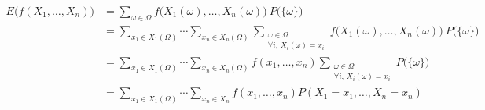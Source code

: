 \begin{prv}
	\begin{align*}
		E\big(f(X_1, \ldots, X_n)\big) &= \sum_{\omega \in \Omega} f\big(X_1(\omega),\ldots,X_n(\omega)\big)\:P\big(\{\omega\}\big)\\
		&= \sum_{x_1 \in X_1(\Omega)} \cdots \sum_{x_n \in X_n(\Omega)} \sum_{\substack{\omega \in \Omega\\\forall i,\,X_i(\omega) = x_i}} f\big(X_1(\omega),\ldots,X_n(\omega)\big)\:P\big(\{\omega\}\big) \\
		&= \sum_{x_1 \in X_1(\Omega)}\cdots\sum_{x_n \in X_n(\Omega)} f(x_1,\ldots,x_n) \sum_{\substack{\omega \in \Omega\\\forall i,\,X_i(\omega) = x_i}} P\big(\{\omega\}\big) \\
		&= \sum_{x_1 \in X_1(\Omega)}\cdots \sum_{x_n \in X_n} f(x_1, \ldots, x_n) P(X_1 = x_1, \ldots, X_n = x_n) \\
	\end{align*}
\end{prv}



